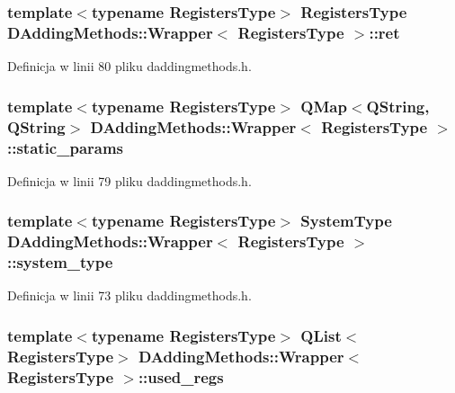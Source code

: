 \hypertarget{class_d_adding_methods_1_1_wrapper_ae7d3f4a32619b51a7f0f0e53fbc87d38}{
\subsubsection[{ret}]{\setlength{\rightskip}{0pt plus 5cm}template$<$typename Registers\-Type$>$ Registers\-Type {\bf D\-Adding\-Methods\-::\-Wrapper}$<$ Registers\-Type $>$\-::ret}}\label{class_d_adding_methods_1_1_wrapper_ae7d3f4a32619b51a7f0f0e53fbc87d38}


Definicja w linii 80 pliku daddingmethods.\-h.

\hypertarget{class_d_adding_methods_1_1_wrapper_a915ee3066596bebdc8f2c21c6cf5b9bc}{
\subsubsection[{static\-\_\-params}]{\setlength{\rightskip}{0pt plus 5cm}template$<$typename Registers\-Type$>$ Q\-Map$<$Q\-String, Q\-String$>$ {\bf D\-Adding\-Methods\-::\-Wrapper}$<$ Registers\-Type $>$\-::static\-\_\-params}}\label{class_d_adding_methods_1_1_wrapper_a915ee3066596bebdc8f2c21c6cf5b9bc}


Definicja w linii 79 pliku daddingmethods.\-h.

\hypertarget{class_d_adding_methods_1_1_wrapper_ae298975da4ef638bef00c8277501eddc}{
\subsubsection[{system\-\_\-type}]{\setlength{\rightskip}{0pt plus 5cm}template$<$typename Registers\-Type$>$ {\bf System\-Type} {\bf D\-Adding\-Methods\-::\-Wrapper}$<$ Registers\-Type $>$\-::system\-\_\-type}}\label{class_d_adding_methods_1_1_wrapper_ae298975da4ef638bef00c8277501eddc}


Definicja w linii 73 pliku daddingmethods.\-h.

\hypertarget{class_d_adding_methods_1_1_wrapper_aba0dc1a5f9addd4317b87e92fb2eb0db}{
\subsubsection[{used\-\_\-regs}]{\setlength{\rightskip}{0pt plus 5cm}template$<$typename Registers\-Type$>$ Q\-List$<$Registers\-Type$>$ {\bf D\-Adding\-Methods\-::\-Wrapper}$<$ Registers\-Type $>$\-::used\-\_\-regs}}\label{class_d_adding_methods_1_1_wrapper_aba0dc1a5f9addd4317b87e92fb2eb0db}


